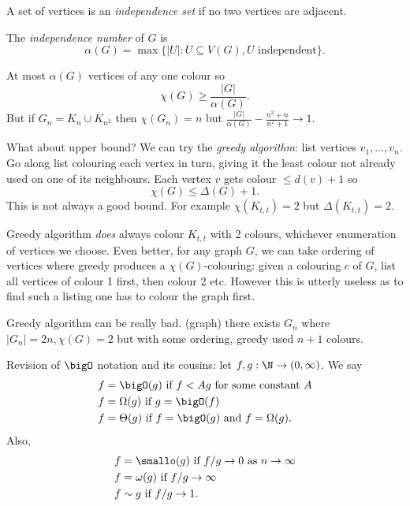 \documentclass[a4paper]{article}
\newcommand*{\Omg}{\Omega}
\newcommand*{\bigT}{\Theta}
\newcommand*{\smallomg}{\omega}
\begin{document}
\begin{definition}
  A set of vertices is an \emph{independence set} if no two vertices are adjacent.

  The \emph{independence number} of \(G\) is
  \[
    \alpha(G) = \max \{|U|: U \subseteq V(G), U \text{ independent}\}.
  \]
\end{definition}

At most \(\alpha(G)\) vertices of any one colour so
\[
  \chi(G) \geq \frac{|G|}{\alpha(G)}.
\]
But if \(G_n = K_n \cup \overline K_{n^2}\) then \(\chi(G_n) = n\) but \(\frac{|G|}{\alpha(G)} - \frac{n^2 + n}{n^2 + 1} \to 1\).

What about upper bound? We can try the \emph{greedy algorithm}: list vertices \(v_1, \dots, v_n\). Go along list colouring each vertex in turn, giving it the least colour not already used on one of its neighbours. Each vertex \(v\) gets colour \(\leq d(v) + 1\) so
\[
  \chi(G) \leq \Delta(G) + 1.
\]
This is not always a good bound. For example \(\chi(K_{t, t}) = 2\) but \(\Delta(K_{t, t}) = 2\).

\begin{remark}
  Greedy algorithm \emph{does} always colour \(K_{t, t}\) with 2 colours, whichever enumeration of vertices we choose. Even better, for any graph \(G\), we can take ordering of vertices where greedy produces a \(\chi(G)\)-colouring: given a colouring \(c\) of \(G\), list all vertices of colour 1 first, then colour 2 etc. However this is utterly useless as to find such a listing one has to colour the graph first.
\end{remark}

Greedy algorithm can be really bad. (graph) there exists \(G_n\) where \(|G_n| = 2n, \chi(G) = 2\) but with some ordering, greedy used \(n + 1\) colours.









\iffalse

Revision of \(\bigO\) notation and its cousins: let \(f,g:\N\to (0,\infty)\). We say
\begin{align*}
  f &= \bigO(g) \text{ if } f< Ag \text{ for some constant } A \\
  f &= \Omg(g) \text{ if } g=\bigO(f) \\
  f &= \bigT(g) \text{ if } f=\bigO(g) \text{ and } f = \Omg(g).
\end{align*}
Also,
\begin{align*}
  f &= \smallo(g) \text{ if } f/g\to 0 \text{ as } n\to \infty \\
  f &= \smallomg(g) \text{ if } f/g\to \infty \\
  f &\sim g \text{ if } f/g\to 1.
\end{align*}
\end{document}
